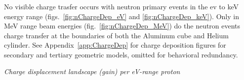 \documentclass[11pt]{article}
\makeatletter
\newenvironment{figurehere}
{\def\@captype{figure}}{}
\makeatother
\begin{document}
\begin{multicols}{2}
No visible charge trasfer occurs with neutron primary events in the ev to keV energy range (figs.~\ref{fig:nChargeDep_eV} and \ref{fig:nChargeDep_keV}).  Only in MeV range beam energies (fig.~\ref{fig:nChargeDep_MeV}) do the neutron events charge transfer at the boundaries of both the Aluminum cube and Helium cylinder. See Appendix~\ref{app:ChargeDep} for charge deposition figures for secondary and tertiary geometric models, omitted for behavioral redundancy.


\vspace{0.15 cm}
\begin{figurehere}
\centering
{}
\caption{\small \emph{Charge displacement landscape (gain) per eV-range proton}}
\label{fig:pChargeDep_eV}
\end{figurehere}
\vspace{0.15 cm}
\begin{figurehere}
\centering
{}

\end{figurehere}
\end{multicols}
\end{document}
